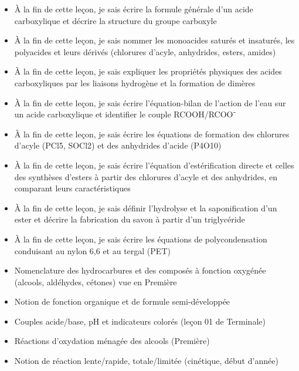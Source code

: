 \documentclass[11pt]{article}
\begin{document}
\begin{objectifs}
\begin{itemize}
\item À la fin de cette leçon, je sais écrire la formule générale d'un acide carboxylique et décrire la structure du groupe carboxyle
\item À la fin de cette leçon, je sais nommer les monoacides saturés et insaturés, les polyacides et leurs dérivés (chlorures d'acyle, anhydrides, esters, amides)
\item À la fin de cette leçon, je sais expliquer les propriétés physiques des acides carboxyliques par les liaisons hydrogène et la formation de dimères
\item À la fin de cette leçon, je sais écrire l'équation-bilan de l'action de l'eau sur un acide carboxylique et identifier le couple RCOOH/RCOO⁻
\item À la fin de cette leçon, je sais écrire les équations de formation des chlorures d'acyle (PCl5, SOCl2) et des anhydrides d'acide (P4O10)
\item À la fin de cette leçon, je sais écrire l'équation d'estérification directe et celles des synthèses d'esters à partir des chlorures d'acyle et des anhydrides, en comparant leurs caractéristiques
\item À la fin de cette leçon, je sais définir l'hydrolyse et la saponification d'un ester et décrire la fabrication du savon à partir d'un triglycéride
\item À la fin de cette leçon, je sais écrire les équations de polycondensation conduisant au nylon 6,6 et au tergal (PET)
\end{itemize}
\end{objectifs}

\begin{prerequis}
\begin{itemize}
\item Nomenclature des hydrocarbures et des composés à fonction oxygénée (alcools, aldéhydes, cétones) vue en Première
\item Notion de fonction organique et de formule semi-développée
\item Couples acide/base, pH et indicateurs colorés (leçon 01 de Terminale)
\item Réactions d'oxydation ménagée des alcools (Première)
\item Notion de réaction lente/rapide, totale/limitée (cinétique, début d'année)
\end{itemize}
\end{prerequis}
\end{document}
